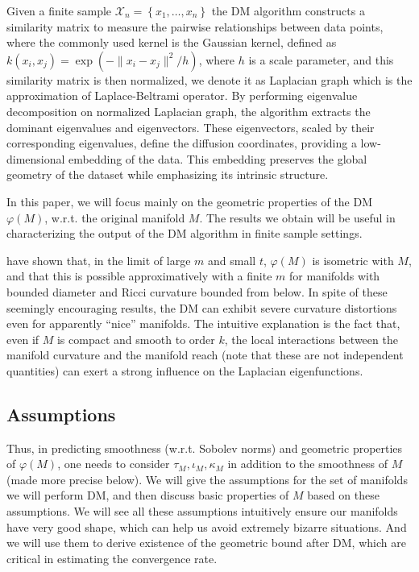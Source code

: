 Given a finite sample $\mathcal{X}_n=\left\{x_1,\dots,x_n\right\}$ the DM algorithm constructs a similarity matrix to measure the pairwise relationships between data points, where the commonly used kernel is the Gaussian kernel, defined as $k(x_i, x_j) = \exp(-\|x_i - x_j\|^2 / h)$, where $h$ is a scale parameter, and this similarity matrix is then normalized, we denote it as Laplacian graph which is the approximation of Laplace-Beltrami operator. By performing eigenvalue decomposition on normalized Laplacian graph, the algorithm extracts the dominant eigenvalues and eigenvectors. These eigenvectors, scaled by their corresponding eigenvalues, define the diffusion coordinates, providing a low-dimensional embedding of the data. This embedding preserves the global geometry of the dataset while emphasizing its intrinsic structure.



In this paper, we will focus mainly on the geometric properties of the DM $\varphi(M)$, w.r.t. the original manifold $M$. The results we obtain will be useful in characterizing the output of the DM algorithm in finite sample settings.

\cite{berard1994embedding} have shown that, in the limit of large $m$ and small $t$, $\varphi(M)$ is isometric with $M$, and that this is possible approximatively with a finite $m$ for manifolds with bounded diameter and Ricci curvature bounded from below. In spite of these seemingly encouraging results, the DM can exhibit severe curvature distortions even for apparently ``nice'' manifolds. The intuitive explanation is the fact that, even if $M$ is compact and smooth to order $k$, the local interactions between the manifold curvature and the manifold reach (note that these are not independent quantities) can exert a strong influence on the Laplacian eigenfunctions. 

\subsection{Assumptions}

Thus, in predicting smoothness (w.r.t. Sobolev norms) and geometric properties of $\varphi(M)$, one needs to consider $\tau_M, \iota_M, \kappa_M$ in addition to the smoothness of $M$ (made more precise below). We will give the assumptions for the set of manifolds we will perform DM, and then discuss basic properties of $M$ based on these assumptions. We will see all these assumptions intuitively ensure our manifolds have very good shape, which can help us avoid extremely bizarre situations. And we will use them to derive existence of the geometric bound after DM, which are critical in estimating the convergence rate.


